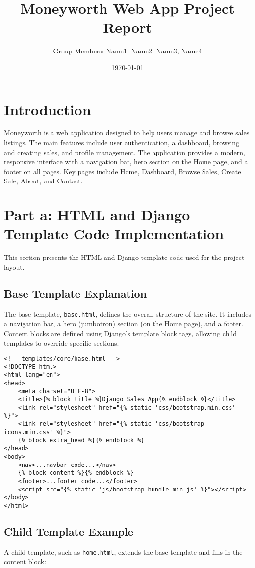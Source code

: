\documentclass[12pt]{article}
\title{Moneyworth Web App Project Report}
\author{Group Members: Name1, Name2, Name3, Name4}
\date{\today}
\begin{document}
\maketitle

\section{Introduction}
Moneyworth is a web application designed to help users manage and browse sales listings. The main features include user authentication, a dashboard, browsing and creating sales, and profile management. The application provides a modern, responsive interface with a navigation bar, hero section on the Home page, and a footer on all pages. Key pages include Home, Dashboard, Browse Sales, Create Sale, About, and Contact.

\section{Part a: HTML and Django Template Code Implementation}
This section presents the HTML and Django template code used for the project layout.

\subsection{Base Template Explanation}
The base template, \texttt{base.html}, defines the overall structure of the site. It includes a navigation bar, a hero (jumbotron) section (on the Home page), and a footer. Content blocks are defined using Django's template block tags, allowing child templates to override specific sections.

\begin{verbatim}
<!-- templates/core/base.html -->
<!DOCTYPE html>
<html lang="en">
<head>
    <meta charset="UTF-8">
    <title>{% block title %}Django Sales App{% endblock %}</title>
    <link rel="stylesheet" href="{% static 'css/bootstrap.min.css' %}">
    <link rel="stylesheet" href="{% static 'css/bootstrap-icons.min.css' %}">
    {% block extra_head %}{% endblock %}
</head>
<body>
    <nav>...navbar code...</nav>
    {% block content %}{% endblock %}
    <footer>...footer code...</footer>
    <script src="{% static 'js/bootstrap.bundle.min.js' %}"></script>
</body>
</html>
\end{verbatim}

\subsection{Child Template Example}
A child template, such as \texttt{home.html}, extends the base template and fills in the content block:
\end{document}
